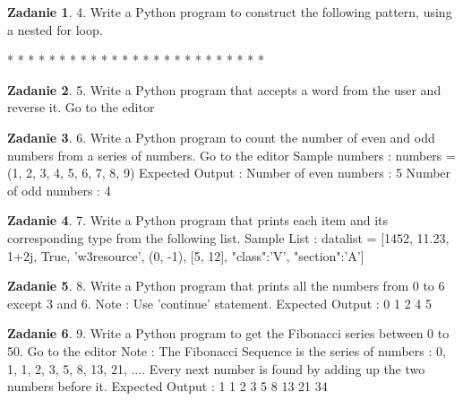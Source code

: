\documentclass[11pt]{article}
\theoremstyle{definition}
\newtheorem{zadanie}{Zadanie}
\begin{document}
\begin{zadanie}


4. Write a Python program to construct the following pattern, using a nested for loop.

* 
* * 
* * * 
* * * * 
* * * * * 
* * * * 
* * * 
* * 
*



\end{zadanie}

\begin{zadanie}


5. Write a Python program that accepts a word from the user and reverse it. Go to the editor


\end{zadanie}

\begin{zadanie}


6. Write a Python program to count the number of even and odd numbers from a series of numbers. Go to the editor
Sample numbers : numbers = (1, 2, 3, 4, 5, 6, 7, 8, 9) 
Expected Output :
Number of even numbers : 5
Number of odd numbers : 4


\end{zadanie}

\begin{zadanie}


7. Write a Python program that prints each item and its corresponding type from the following list.
Sample List : datalist = [1452, 11.23, 1+2j, True, 'w3resource', (0, -1), [5, 12], {"class":'V', "section":'A'}]


\end{zadanie}

\begin{zadanie}


8. Write a Python program that prints all the numbers from 0 to 6 except 3 and 6.
Note : Use 'continue' statement.
Expected Output : 0 1 2 4 5


\end{zadanie}

\begin{zadanie}


9. Write a Python program to get the Fibonacci series between 0 to 50. Go to the editor
Note : The Fibonacci Sequence is the series of numbers :
0, 1, 1, 2, 3, 5, 8, 13, 21, ....
Every next number is found by adding up the two numbers before it.
Expected Output : 1 1 2 3 5 8 13 21 34


\end{zadanie}
\end{document}

